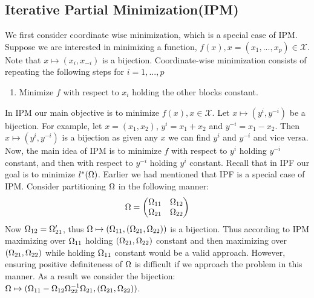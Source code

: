 \documentclass[12pt, leqno]{article}
\def\om{\ensuremath\Omega}
\begin{document}
\subsection{Iterative Partial Minimization(IPM)} We first consider
coordinate wise minimization, which is a special case of IPM. Suppose we are interested in minimizing a
function, $f(x), x = (x_1,...,x_p) \in \mathcal{X}$. Note that $x \mapsto (x_i,x_{-i})$ is a
bijection. Coordinate-wise
minimization consists of repeating the following steps for $i = 1,
... , p$
\begin{enumerate}
\item Minimize $f$ with respect to $x_i$ holding the other blocks constant. 
\end{enumerate}
In IPM our main objective is to minimize $f(x),x \in
\mathcal{X}$. Let $x \mapsto (y^i,y^{-i})$ be a bijection. For
example, let $x = (x_1,x_2)$, $y^{i} = x_1+x_2$ and $y^{-i} =
x_1-x_2$. Then $x \mapsto (y^i,y^{-i})$ is a bijection as given any
$x$ we can find $y^i$ and $y^{-i}$ and vice versa. Now, the main idea
of IPM is to minimize $f$ with respect to $y^i$ holding $y^{-i}$
constant, and then with respect to $y^{-i}$ holding $y^i$
constant. 
Recall that in IPF our
goal is to minimize $l^{*}(\om)$. Earlier we had mentioned that IPF is
a special case of IPM. Consider partitioning $\om$ in the following manner: 
\[
\om = \begin{pmatrix} \om_{11} & \om_{12} \\
\om_{21}& \om_{22} \\
\end{pmatrix}
\]
Now $\om_{12} = \om_{21}'$, thus $\om \mapsto
(\om_{11},(\om_{21},\om_{22}))$ is a bijection. Thus according to IPM
maximizing over $\om_{11}$ holding $(\om_{21},\om_{22})$ constant and
then maximizing over $(\om_{21},\om_{22})$ while holding $\om_{11}$
constant would be a valid approach. However, ensuring positive
definiteness of $\om$ is difficult if we approach the problem in this
manner. As a result we consider the bijection: $\om \mapsto (\om_{11}
- \om_{12} \om_{22}^{-1} \om_{21},(\om_{21},\om_{22}))$.  
\end{document}
